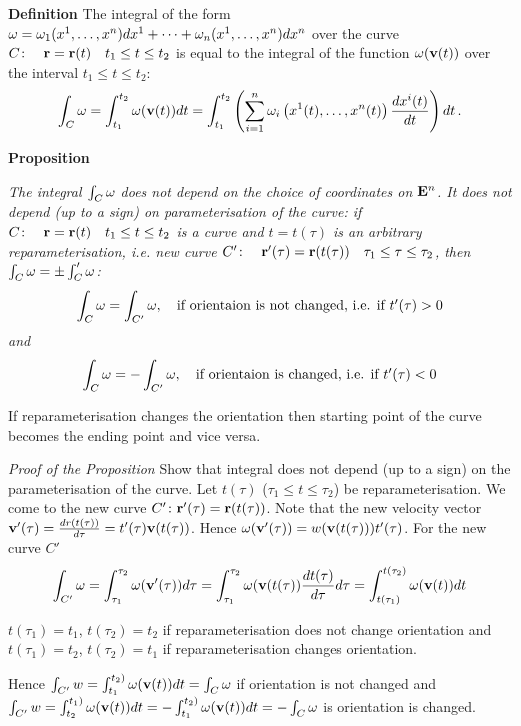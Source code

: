 \documentclass[12pt]{article}
\numberwithin{equation}{section}
\begin{document}
{\bf Definition}  The integral of the form ${\omega}={\omega}_1(x^1,\dots,x^n)dx^1+\dots+{\omega}_n(x^1,\dots,x^n)dx^n$
 over the curve
$C\colon\quad {\bf r}={\bf r}(t)\quad t_1\leq t\leq t_2$ is equal to the integral of the function ${\omega}({\bf v}(t))$
over the interval $t_1\leq t\leq t_2$:
              \begin{equation}\label{definitionofintegral}
    \int_C {\omega}=\int_{t_1}^{t_2}{\omega}({\bf v}(t))dt=
               \int_{t_1}^{t_2}
               \left(
          \sum_{i=1}^n{\omega}_i\left(x^1(t),\dots,x^n(t)\right){d x^i(t)\over dt}
              \right)dt\,.
            \end{equation}


 \m



{\bf Proposition}
{\it The integral $\int_C {\omega}$ does not depend on the choice of coordinates on ${\bf E}^n$. It does not depend
(up to a sign) on parameterisation of the curve: if $C\colon\quad {\bf r}={\bf r}(t)\quad t_1\leq t\leq t_2$
is a curve and $t=t(\tau)$ is an arbitrary reparameterisation, i.e.
new curve $C'\colon\quad {\bf r}'(\tau)={\bf r}(t(\tau))\quad \tau_1\leq \tau\leq \tau_2$, then
  $\int_C {\omega}=\pm\int_C' {\omega}$:
\begin{equation*}\label{changingtheparameterisationforintegral1}
    \int_C {\omega}=\int_{C'} {\omega},\quad \hbox{if orientaion is not changed, i.e. if $t'(\tau)> 0$}
\end{equation*}
and
\begin{equation*}\label{changingtheparameterisationforintegral2}
    \int_C {\omega}=-\int_{C'} {\omega},\quad \hbox{if orientaion is  changed, i.e. if $t'(\tau)< 0$}
\end{equation*}
\m

 If reparameterisation changes the orientation then starting point of the curve becomes the ending point and vice versa.}


\m



{\footnotesize {\it Proof of the Proposition}
Show that integral does not depend (up to a sign) on the
parameterisation of the curve. Let $t(\tau)$ ($\tau_1\leq t\leq
\tau_2$) be reparameterisation. We come to the new curve $C'\colon {\bf r}'(\tau)={\bf r}(t(\tau))$.
Note that  the new velocity vector  ${\bf v}'(\tau)={dr(t(\tau))\over d\tau}=t'(\tau){\bf v}(t(\tau))$.
Hence  ${\omega}({\bf v}'(\tau))=w({\bf v}(t(\tau)))t'(\tau)$.
 For the new curve  $C'$
           $$
  \int_{C^\prime} {\omega}=\int_{\tau_1}^{\tau_2}{\omega}({\bf v}'(\tau))d\tau=
   \int_{\tau_1}^{\tau_2}{\omega}({\bf v}(t(\tau)){dt(\tau)\over d\tau}d\tau=
   \int_{t(\tau_1)}^{t(\tau_2)}{\omega}({\bf v}(t))dt
              $$

  $t(\tau_1)=t_1$, $t(\tau_2)=t_2$ if reparameterisation does not change orientation and
  $t(\tau_1)=t_2$, $t(\tau_2)=t_1$ if reparameterisation changes orientation.

Hence $\int_{C'} w=\int_{t_1}^{t_2)}{\omega}({\bf v}(t))dt=\int_C {\omega}$ if orientation is not changed and
$\int_{C'} w=\int_{t_2}^{t_1)}{\omega}({\bf v}(t))dt=-\int_{t_1}^{t_2)}{\omega}({\bf v}(t))dt=-\int_C {\omega}$
is orientation is changed.
}
\end{document}
